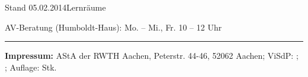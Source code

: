 \documentclass[10pt]{article}
\begin{document}
\begin{rueckseite}{Stand 05.02.2014}{Lernr\"aume}
{\begin{minipage}[b]{0.993\linewidth}
{{AV-Beratung (Humboldt-Haus): \hfill{}Mo. -- Mi., Fr. 10\Uhr{} -- 12\Uhr{} Uhr                  \hspace*{1ex}\\
\vspace*{-1.7ex}

}
}
\vspace*{-1ex}

\rule{\linewidth}{.5pt}
\vspace*{-3.5ex}

\textbf{\scriptsize Impressum:}
{\footnotesize AStA der RWTH Aachen, Peterstr. 44-46, 52062 Aachen; ViSdP:  \visdp{}; ; Auflage: 
\auflagenhoehe \hspace*{1ex}Stk. \hspace*{\fill}}
\end{minipage}
}

\vspace{-5ex}

%
\end{rueckseite}
\end{document}
